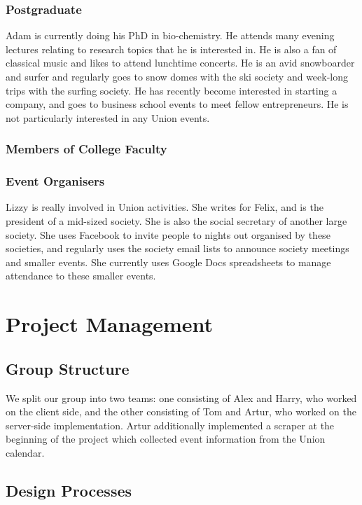 \documentclass[11pt]{article}
\begin{document}
\subsubsection{Postgraduate}
Adam is currently doing his PhD in bio-chemistry. He attends many evening lectures relating to research topics that he is interested in. He is also a fan of classical music and likes to attend lunchtime concerts. He is an avid snowboarder and surfer and regularly goes to snow domes with the ski society and week-long trips with the surfing society. He has recently become interested in starting a company, and goes to business school events to meet fellow entrepreneurs. He is not particularly interested in any Union events.

\subsubsection{Members of College Faculty}
\subsubsection{Event Organisers}
Lizzy is really involved in Union activities. She writes for Felix, and is the president of a mid-sized society. She is also the social secretary of another large society. She uses Facebook to invite people to nights out organised by these societies, and regularly uses the society email lists to announce society meetings and smaller events. She currently uses Google Docs spreadsheets to manage attendance to these smaller events.
\section {Project Management}

\subsection {Group Structure}

We split our group into two teams: one consisting of Alex and Harry, who worked on the client side, and the other consisting of Tom and Artur, who worked on the server-side implementation. Artur additionally implemented a scraper at the beginning of the project which collected event information from the Union calendar.

\subsection {Design Processes}
\end{document}
